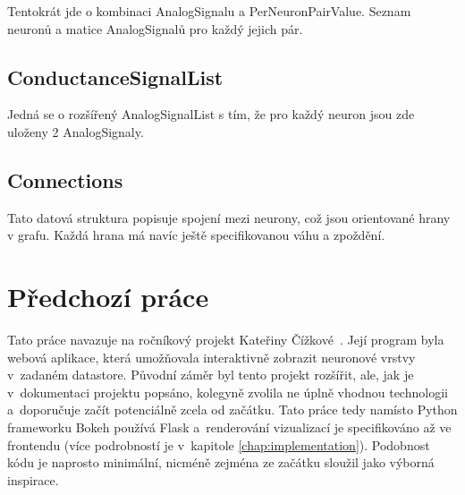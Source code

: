 Tentokrát jde o kombinaci AnalogSignalu a PerNeuronPairValue. Seznam neuronů a matice AnalogSignalů pro každý jejich pár.

\subsection{ConductanceSignalList}

Jedná se o rozšířený AnalogSignalList s tím, že pro každý neuron jsou zde uloženy 2 AnalogSignaly.

\subsection{Connections}

Tato datová struktura popisuje spojení mezi neurony, což jsou orientované hrany v grafu. Každá hrana má navíc ještě specifikovanou váhu a zpoždění.

\section{Předchozí práce}

Tato práce navazuje na ročníkový projekt Kateřiny Čížkové~\cite{Cizkova2020nprg035}. Její program byla webová aplikace, která umožňovala interaktivně zobrazit neuronové vrstvy v~zadaném datastore. Původní záměr byl tento projekt rozšířit, ale, jak je v~dokumentaci projektu popsáno, kolegyně zvolila ne úplně vhodnou technologii a~doporučuje začít potenciálně zcela od začátku. Tato práce tedy namísto Python frameworku Bokeh používá Flask a~renderování vizualizací je specifikováno až ve frontendu (více podrobností je v~kapitole \ref{chap:implementation}). Podobnost kódu je naprosto minimální, nicméně zejména ze začátku sloužil jako výborná inspirace.